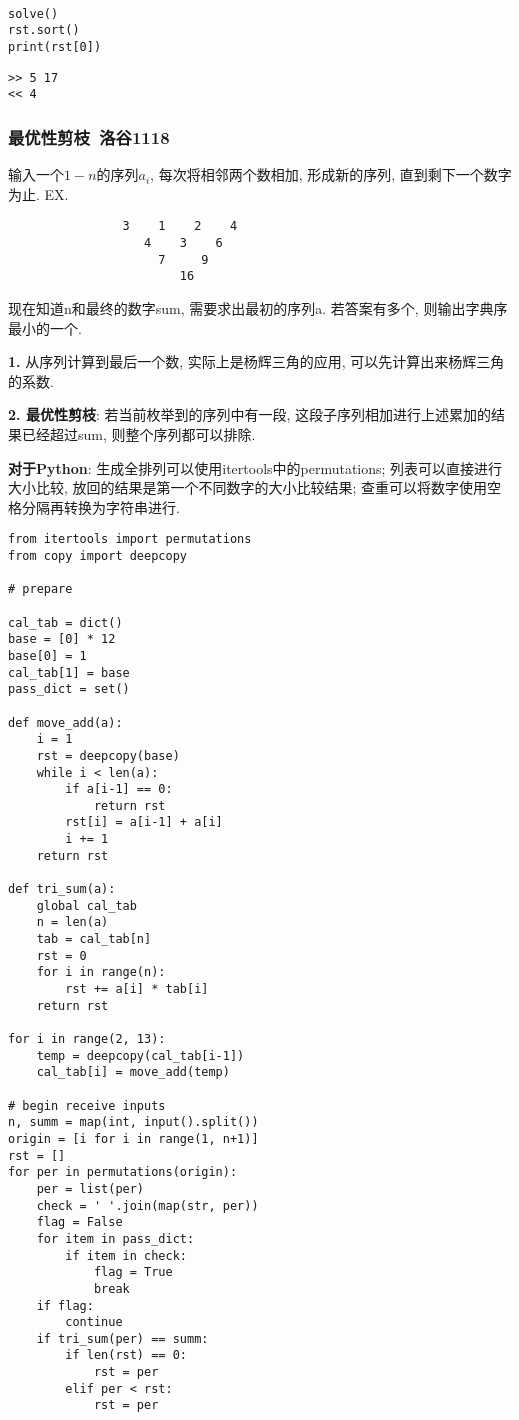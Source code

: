 \documentclass[../main]{subfiles}
\begin{document}
\begin{sloppy}
\begin{lstlisting}[style = Python]
            
solve()
rst.sort()
print(rst[0])
\end{lstlisting}

\begin{verbatim}
>> 5 17
<< 4
\end{verbatim}

\newpage
        \subsubsection{最优性剪枝\ 洛谷1118}

            输入一个$1-n$的序列$a_i$, 每次将相邻两个数相加, 形成新的序列, 直到剩下一个数字为止. EX.

            \begin{verbatim}
                3    1    2    4
                   4    3    6
                     7     9
                        16 
            \end{verbatim}

            现在知道n和最终的数字sum, 需要求出最初的序列a. 若答案有多个, 则输出字典序最小的一个.

            \textbf{1.} 从序列计算到最后一个数, 实际上是杨辉三角的应用, 可以先计算出来杨辉三角的系数.

            \textbf{2. 最优性剪枝}: 若当前枚举到的序列中有一段, 这段子序列相加进行上述累加的结果已经超过sum, 则整个序列都可以排除. 

            \textbf{对于Python}: 生成全排列可以使用itertools中的permutations; 列表可以直接进行大小比较, 放回的结果是第一个不同数字的大小比较结果; 查重可以将数字使用空格分隔再转换为字符串进行.

\begin{lstlisting}[style = Python]
from itertools import permutations
from copy import deepcopy

# prepare

cal_tab = dict()
base = [0] * 12
base[0] = 1
cal_tab[1] = base
pass_dict = set()

def move_add(a):
    i = 1
    rst = deepcopy(base)
    while i < len(a):
        if a[i-1] == 0:
            return rst
        rst[i] = a[i-1] + a[i]
        i += 1
    return rst

def tri_sum(a):
    global cal_tab
    n = len(a)
    tab = cal_tab[n]
    rst = 0
    for i in range(n):
        rst += a[i] * tab[i]
    return rst

for i in range(2, 13):
    temp = deepcopy(cal_tab[i-1])
    cal_tab[i] = move_add(temp)

# begin receive inputs
n, summ = map(int, input().split())
origin = [i for i in range(1, n+1)]
rst = []
for per in permutations(origin):
    per = list(per)
    check = ' '.join(map(str, per))
    flag = False
    for item in pass_dict:
        if item in check:
            flag = True
            break
    if flag:
        continue
    if tri_sum(per) == summ:
        if len(rst) == 0:
            rst = per
        elif per < rst:
            rst = per


\end{lstlisting}
\end{sloppy}
\end{document}
